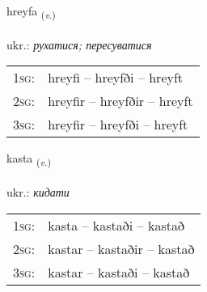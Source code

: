 \documentclass[frontgrid, backgrid]{flacards}\usepackage[]{graphicx}\usepackage[]{xcolor}
\begin{document}
\renewcommand{\blhead}{\vskip5pt {\small\bfseries\footnotesize Sagnorð | дієслово }}
\renewcommand{\bcfoot}{\vskip5pt \hspace{2pt}{\small\bfseries\footnotesize 2K}}


{hreyfa \small{\textsubscript{(\textit{v.})}} \\[1ex] %
\textphonetic{[r̥eiːva]} \\
ukr.: \emph{рухатися; пересуватися} \\  [2ex]
\renewcommand*{\arraystretch}{0.8}
\begin{tabular}{p{1cm}l}
\textsc{1sg}: & hreyfi -- hreyfði -- hreyft \\ 
\textsc{2sg}: & hreyfir -- hreyfðir -- hreyft \\ 
\textsc{3sg}: & hreyfir -- hreyfði -- hreyft \\ 
\end{tabular}
}

\renewcommand{\flhead}{\vskip5pt \fboxsep=0pt {\small\bfseries\footnotesize Sagnorð | дієслово}}
\renewcommand{\fcfoot}{\vskip5pt \fboxsep=0pt \hspace{2pt}{\small\bfseries\footnotesize 2K}}

\renewcommand{\blhead}{\vskip5pt {\small\bfseries\footnotesize Sagnorð | дієслово }}
\renewcommand{\bcfoot}{\vskip5pt \hspace{2pt}{\small\bfseries\footnotesize 2K}}


{kasta \small{\textsubscript{(\textit{v.})}} \\[1ex] %
\textphonetic{[kʰasta]} \\
ukr.: \emph{кидати} \\  [2ex]
\renewcommand*{\arraystretch}{0.8}
\begin{tabular}{p{1cm}l}
\textsc{1sg}: & kasta -- kastaði -- kastað \\ 
\textsc{2sg}: & kastar -- kastaðir -- kastað \\ 
\textsc{3sg}: & kastar -- kastaði -- kastað \\ 
\end{tabular}
}
\end{document}
